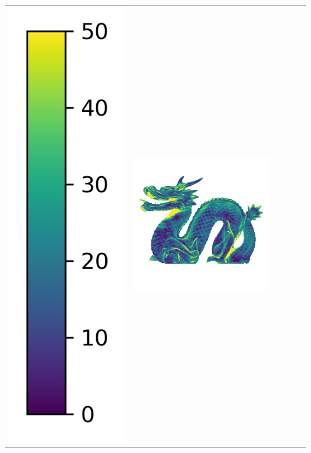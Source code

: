 \begin{tabularx}{\linewidth}{@{}Y@{}Y@{}Y@{}Y@{}Y@{}Y@{}}
\includegraphics[width=0.2\linewidth]{semisynthetic/colorbar_error_vertical.png} &
\includegraphics[width=\linewidth]{semisynthetic/20150514_21_ours_err.png} &

\end{tabularx}
